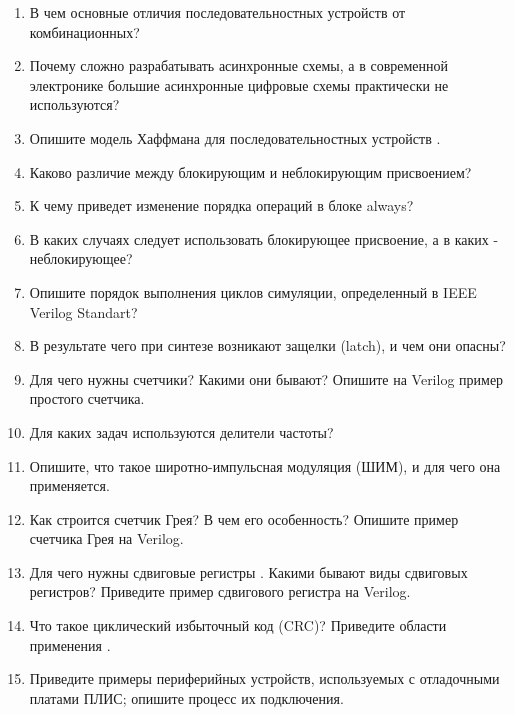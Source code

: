 \documentclass[a4paper,14pt]{article}
\begin{document}
	\begin{enumerate}
		\item В чем основные отличия последовательностных устройств от комбинационных?
		
		\item Почему сложно разрабатывать асинхронные схемы, а в современной электронике
		большие асинхронные цифровые схемы практически не используются?
		
		\item Опишите модель Хаффмана для последовательностных устройств .
		
		\item Каково различие между блокирующим и неблокирующим присвоением?
		
		\item К чему приведет изменение порядка операций в блоке always?
		
		\item В каких случаях следует использовать блокирующее присвоение, а в каких - неблокирующее?
		
		\item Опишите порядок выполнения циклов симуляции, определенный в IEEE Verilog	Standart?
		
		\item В результате чего при синтезе возникают защелки (latch), и чем они опасны?
		
		\item Для чего нужны счетчики? Какими они бывают? Опишите на Verilog пример простого
		счетчика.
		
		\item Для каких задач используются делители частоты?
			
		\item Опишите, что такое широтно-импульсная модуляция (ШИМ), и для чего она
		применяется.
		
		\item Как строится счетчик Грея? В чем его особенность? Опишите пример счетчика Грея на
		Verilog.
		
		\item Для чего нужны сдвиговые регистры . Какими бывают виды сдвиговых регистров?
		Приведите пример сдвигового регистра на Verilog.
		
		\item Что такое циклический избыточный код (CRC)? Приведите области применения .
		
		\item Приведите примеры периферийных устройств, используемых с отладочными платами
		ПЛИС; опишите процесс их подключения.
	\end{enumerate}
	
\end{document}
